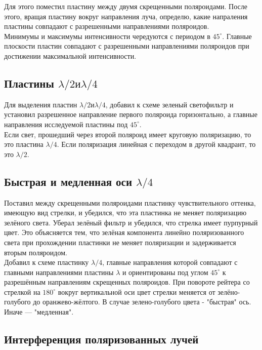 Для этого поместил пластину между двумя скрещенными поляроидами. После этого, вращая
пластину вокруг направления луча, определю, какие напраления пластины совпадают с
разрешенными направлениями поляроидов. \\

Минимумы и максимумы интенсивности чередуются с периодом в $ 45^\circ $. Главные плоскости
пластин совпадают с разрешенными направлениями поляроидов при достижении максимальной
интенсивности.

\subsection{Пластины $ \lambda/2 \texttt{и} \lambda/4 $}

Для выделения пластин $ \lambda/2 \texttt{и} \lambda/4 $, добавил к схеме зеленый
светофильтр и установил разрешенное направление первого поляроида горизонтально, а
главные направления исследуемой пластины под $ 45^\circ $. \\

Если свет, прошедший через второй поляроид имеет круговую поляризацию, то это пластина
$ \lambda/4 $. Если поляризация линейная с переходом в другой квадрант, то это
$ \lambda/2 $. \\

\subsection{Быстрая и медленная оси $ \lambda/4 $}

Поставил между скрещенными поляроидами пластинку чувствительного оттенка, имеющую вид
стрелки, и убедился, что эта пластинка не меняет поляризацию зелёного света. Уберал зелёный
фильтр и убедился, что стрелка имеет пурпурный цвет. Это объясняется тем, что зелёная
компонента линейно поляризованного света при прохождении пластинки не меняет поляризации
и задерживается вторым поляроидом. \\

Добавил к схеме пластинку $ \lambda/4 $, главные направления которой совпадают с главными
направлениями пластины $ \lambda $ и ориентированы под углом $ 45^\circ $ к разрешённым
направлениям скрещенных поляроидов. При повороте рейтера со стрелкой на $ 180^\circ $
вокруг вертикальной оси цвет стрелки меняется от зелёно-голубого до оранжево-жёлтого.
В случае зелено-голубого цвета - "быстрая" ось. Иначе --- "медленная".

\subsection{Интерференция поляризованных лучей}

